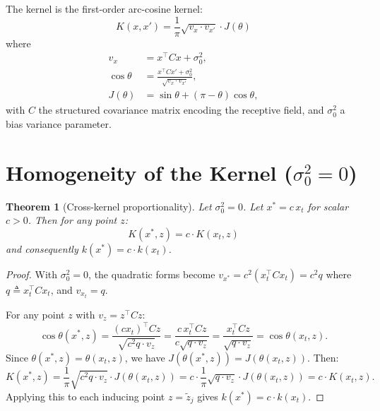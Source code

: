 \documentclass[11pt]{article}
\newtheorem{theorem}{Theorem}
\begin{document}
The kernel is the first-order arc-cosine kernel:
\begin{equation}\label{eq:kernel}
    K(x, x') = \frac{1}{\pi} \sqrt{v_x \cdot v_{x'}} \cdot J(\theta)
\end{equation}
where
\begin{align}
    v_x &= x^\top C x + \sigma_0^2, \label{eq:vx}\\
    \cos\theta &= \frac{x^\top C x' + \sigma_0^2}{\sqrt{v_x \cdot v_{x'}}}, \label{eq:costheta}\\
    J(\theta) &= \sin\theta + (\pi - \theta)\cos\theta, \label{eq:J}
\end{align}
with $C$ the structured covariance matrix encoding the receptive field,
and $\sigma_0^2$ a bias variance parameter.

\section{Homogeneity of the Kernel ($\sigma_0^2 = 0$)}

\begin{theorem}[Cross-kernel proportionality]\label{thm:proportionality}
Let $\sigma_0^2 = 0$. Let $x^* = c \, x_t$ for scalar $c > 0$. Then for any point $z$:
\begin{equation}
    K(x^*, z) = c \cdot K(x_t, z)
\end{equation}
and consequently $k(x^*) = c \cdot k(x_t)$.
\end{theorem}

\begin{proof}
With $\sigma_0^2 = 0$, the quadratic forms become $v_{x^*} = c^2 (x_t^\top C x_t) = c^2 q$
where $q \triangleq x_t^\top C x_t$, and $v_{x_t} = q$.

For any point $z$ with $v_z = z^\top C z$:
\[
    \cos\theta(x^*, z) = \frac{(cx_t)^\top C z}{\sqrt{c^2 q \cdot v_z}}
    = \frac{c \, x_t^\top C z}{c \sqrt{q \cdot v_z}}
    = \frac{x_t^\top C z}{\sqrt{q \cdot v_z}}
    = \cos\theta(x_t, z).
\]
Since $\theta(x^*, z) = \theta(x_t, z)$, we have $J(\theta(x^*, z)) = J(\theta(x_t, z))$. Then:
\[
    K(x^*, z) = \frac{1}{\pi}\sqrt{c^2 q \cdot v_z} \cdot J(\theta(x_t, z))
    = c \cdot \frac{1}{\pi}\sqrt{q \cdot v_z} \cdot J(\theta(x_t, z))
    = c \cdot K(x_t, z).
\]
Applying this to each inducing point $z = \tilde{z}_j$ gives $k(x^*) = c \cdot k(x_t)$.
\end{proof}
\end{document}
